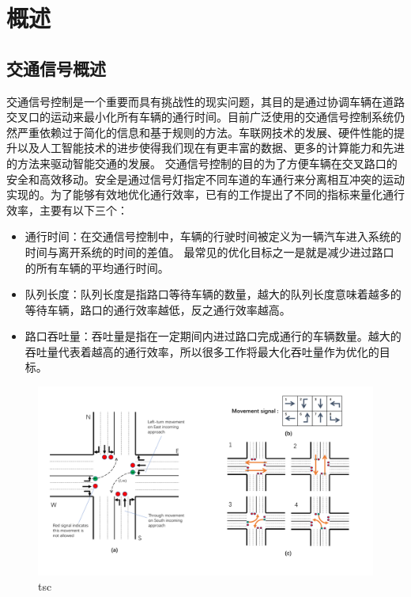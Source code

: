 
\chapter{概述}
\section{交通信号概述}
交通信号控制是一个重要而具有挑战性的现实问题，其目的是通过协调车辆在道路交叉口的运动来最小化所有车辆的通行时间。目前广泛使用的交通信号控制系统仍然严重依赖过于简化的信息和基于规则的方法。车联网技术的发展、硬件性能的提升以及人工智能技术的进步使得我们现在有更丰富的数据、更多的计算能力和先进的方法来驱动智能交通的发展。 
交通信号控制的目的为了方便车辆在交叉路口的安全和高效移动。安全是通过信号灯指定不同车道的车通行来分离相互冲突的运动实现的。为了能够有效地优化通行效率，已有的工作提出了不同的指标来量化通行效率，主要有以下三个：
\begin{itemize}
    \item 通行时间：在交通信号控制中，车辆的行驶时间被定义为一辆汽车进入系统的时间与离开系统的时间的差值。 最常见的优化目标之一是就是减少进过路口的所有车辆的平均通行时间。
    \item 队列长度：队列长度是指路口等待车辆的数量，越大的队列长度意味着越多的等待车辆，路口的通行效率越低，反之通行效率越高。
    \item 路口吞吐量：吞吐量是指在一定期间内进过路口完成通行的车辆数量。越大的吞吐量代表着越高的通行效率，所以很多工作将最大化吞吐量作为优化的目标。
\end{itemize}

\begin{figure}[htb]
    \includegraphics[width=.9\textwidth]{fig/tsc.pdf}
    \caption{tsc}
    \label{fig:tsc}
\end{figure}

